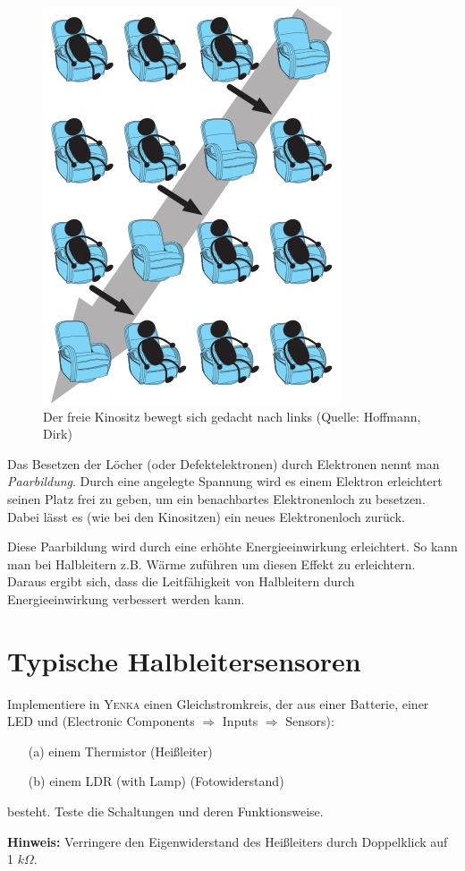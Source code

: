 \begin{figure}[htp]
\begin{center}
\includegraphics[scale=.7]{pics/Kino}
\caption{Der freie Kinositz bewegt sich gedacht nach links (Quelle: Hoffmann, Dirk)}
\label{Abb:Kino}
\end{center}
\end{figure}


Das Besetzen der Löcher (oder Defektelektronen) durch Elektronen nennt man \emph{Paarbildung}.
Durch eine angelegte Spannung wird es einem Elektron erleichtert seinen Platz frei zu geben, um ein benachbartes Elektronenloch zu besetzen.
Dabei lässt es (wie bei den Kinositzen) ein neues Elektronenloch zurück.

Diese Paarbildung wird durch eine erhöhte Energieeinwirkung erleichtert.
So kann man bei Halbleitern z.B. Wärme zuführen um diesen Effekt zu erleichtern.
Daraus ergibt sich, dass die Leitfähigkeit von Halbleitern durch Energieeinwirkung verbessert werden kann.



\section{Typische Halbleitersensoren}

\begin{Aufgabe}
Implementiere in \textsc{Yenka} einen Gleichstromkreis, der aus einer Batterie, einer LED und (Electronic Components $\Rightarrow$ Inputs $\Rightarrow$ Sensors):
\begin{itemize}
\item[(a)] einem Thermistor (Heißleiter)
\item[(b)] einem LDR (with Lamp) (Fotowiderstand)
\end{itemize}
besteht.
Teste die Schaltungen und deren Funktionsweise.

\textbf{Hinweis:} Verringere den Eigenwiderstand des Heißleiters durch Doppelklick auf 1 $k\Omega$.
\end{Aufgabe}

